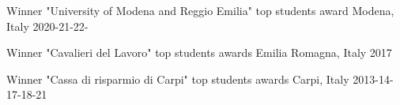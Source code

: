 






\begin{cvhonors}

  \cvhonor
    {Winner} %
    {"University of Modena and Reggio Emilia" top students award} %
    {Modena, Italy} %
    {2020-21-22-} %

  \cvhonor
    {Winner} %
    {"Cavalieri del Lavoro" top students awards } %
    {Emilia Romagna, Italy} %
    {2017} %

  \cvhonor
    {Winner} %
    {"Cassa di risparmio di Carpi" top students awards} %
    {Carpi, Italy} %
    {2013-14-17-18-21} %

\end{cvhonors}
